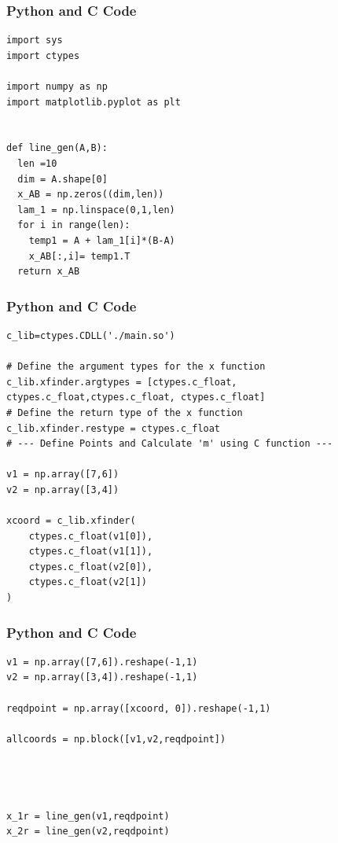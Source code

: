\documentclass{beamer}
\begin{document}
\begin{frame}[fragile]
\frametitle{Python and C Code}

\begin{lstlisting}
import sys 
import ctypes

import numpy as np
import matplotlib.pyplot as plt


def line_gen(A,B):
  len =10
  dim = A.shape[0]
  x_AB = np.zeros((dim,len))
  lam_1 = np.linspace(0,1,len)
  for i in range(len):
    temp1 = A + lam_1[i]*(B-A)
    x_AB[:,i]= temp1.T
  return x_AB

\end{lstlisting}

\end{frame}

\begin{frame}[fragile]
\frametitle{Python and C Code}

\begin{lstlisting}
c_lib=ctypes.CDLL('./main.so')

# Define the argument types for the x function
c_lib.xfinder.argtypes = [ctypes.c_float, ctypes.c_float,ctypes.c_float, ctypes.c_float]
# Define the return type of the x function
c_lib.xfinder.restype = ctypes.c_float
# --- Define Points and Calculate 'm' using C function ---

v1 = np.array([7,6])
v2 = np.array([3,4])

xcoord = c_lib.xfinder(
    ctypes.c_float(v1[0]),
    ctypes.c_float(v1[1]), 
    ctypes.c_float(v2[0]), 
    ctypes.c_float(v2[1])
)
\end{lstlisting}

\end{frame}

\begin{frame}[fragile]
\frametitle{Python and C Code}
\begin{lstlisting}
v1 = np.array([7,6]).reshape(-1,1)
v2 = np.array([3,4]).reshape(-1,1)

reqdpoint = np.array([xcoord, 0]).reshape(-1,1)

allcoords = np.block([v1,v2,reqdpoint])




x_1r = line_gen(v1,reqdpoint)
x_2r = line_gen(v2,reqdpoint)

\end{lstlisting}
\end{frame}
\end{document}
